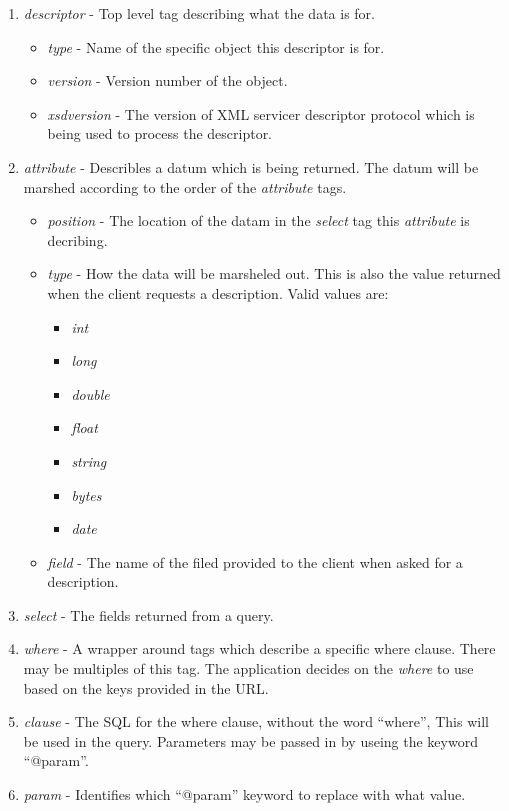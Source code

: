 \begin{enumerate}
\item \emph{descriptor} - Top level tag describing what the data is for.
\begin{itemize}
\item \emph{type} - Name of the specific object this descriptor is for.
\item \emph{version} - Version number of the object.
\item \emph{xsdversion} - The version of XML servicer descriptor protocol which is being used 
to process the descriptor.
\end{itemize}
\item \emph{attribute} - Describles a datum which is being returned. The datum will be marshed 
according to the order of the \emph{attribute} tags.
\begin{itemize}
\item \emph{position} - The location of the datam in the \emph{select} tag this \emph{attribute}
is decribing.
\item \emph{type} - How the data will be marsheled out.  This is also the value returned when 
the client requests a description.  Valid values are:
\begin{itemize}
\item \emph{int}
\item \emph{long}
\item \emph{double}
\item \emph{float}
\item \emph{string}
\item \emph{bytes}
\item \emph{date}
\end{itemize}
\item \emph{field} - The name of the filed provided to the client when asked for a description.
\end{itemize}
\item \emph{select} - The fields returned from a query.
\item \emph{where} - A wrapper around tags which describe a specific where clause.  There may be 
multiples of this  tag.  The application decides on the \emph{where} to use based on the keys 
provided in the URL.
\item \emph{clause} - The SQL for the where clause, without the word ``where'', This will be used 
in the query.  Parameters may be passed in by useing the keyword ``@param''.  
\item \emph{param} - Identifies which ``@param'' keyword to replace with what value.

\end{enumerate}
